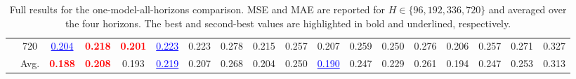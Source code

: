 \begin{table}[H]
{\begin{tabular}{cc|cc|cc|cc|cc|cc|cc|cc|cc}
 & 720 & \textcolor{blue}{\underline{0.204}} & \textcolor{red}{\textbf{0.218}} & \textcolor{red}{\textbf{0.201}} & \textcolor{blue}{\underline{0.223}} & 0.223 & 0.278 & 0.215 & 0.257 & 0.207 & 0.259 & 0.250 & 0.276 & 0.206 & 0.257 & 0.271 & 0.327 \\
\cmidrule(lr){2-18}
 & Avg. & \textcolor{red}{\textbf{0.188}} & \textcolor{red}{\textbf{0.208}} & 0.193 & \textcolor{blue}{\underline{0.219}} & 0.207 & 0.268 & 0.204 & 0.250 & \textcolor{blue}{\underline{0.190}} & 0.247 & 0.229 & 0.261 & 0.194 & 0.247 & 0.253 & 0.313 \\
\bottomrule
\end{tabular}%
}
\caption{Full results for the one-model-all-horizons comparison. MSE and MAE are reported for $H\in\{96,192,336,720\}$ and averaged over the four horizons. The best and second-best values are highlighted in bold and underlined, respectively.}
\label{tab:appendix-one-model}
\end{table}

